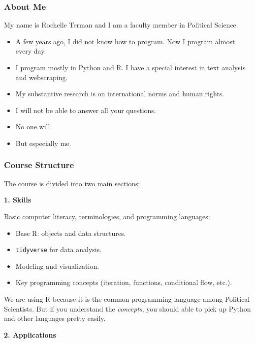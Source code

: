 \documentclass[
]{book}
\providecommand{\tightlist}{%
  \setlength{\itemsep}{0pt}\setlength{\parskip}{0pt}}
\begin{document}
\hypertarget{about-me}{%
\subsubsection*{About Me}\label{about-me}}

My name is Rochelle Terman and I am a faculty member in Political Science.

\begin{itemize}
\tightlist
\item
  A few years ago, I did not know how to program. Now I program almost every day.
\item
  I program mostly in Python and R. I have a special interest in text analysis and webscraping.
\item
  My substantive research is on international norms and human rights.
\item
  I will not be able to answer all your questions.
\item
  No one will.
\item
  But especially me.
\end{itemize}

\hypertarget{course-structure}{%
\subsubsection*{Course Structure}\label{course-structure}}

The course is divided into two main sections:

\textbf{1. Skills}

Basic computer literacy, terminologies, and programming languages:

\begin{itemize}
\tightlist
\item
  Base R: objects and data structures.
\item
  \texttt{tidyverse} for data analysis.
\item
  Modeling and visualization.
\item
  Key programming concepts (iteration, functions, conditional flow, etc.).
\end{itemize}

We are using R because it is the common programming language among Political Scientists. But if you understand the \emph{concepts}, you should able to pick up Python and other languages pretty easily.

\textbf{2. Applications}
\end{document}
